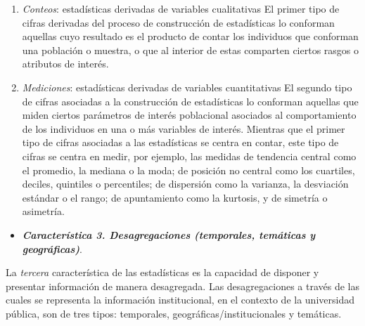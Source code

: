 \documentclass[
]{book}
\providecommand{\tightlist}{%
  \setlength{\itemsep}{0pt}\setlength{\parskip}{0pt}}
\begin{document}
\begin{enumerate}
\def\labelenumi{\arabic{enumi}.}
\item
  \emph{Conteos}: estadísticas derivadas de variables cualitativas
  El primer tipo de cifras derivadas del proceso de construcción de estadísticas lo conforman aquellas cuyo resultado es el producto de contar los individuos que conforman una población o muestra, o que al interior de estas comparten ciertos rasgos o atributos de interés.
\item
  \emph{Mediciones}: estadísticas derivadas de variables cuantitativas
  El segundo tipo de cifras asociadas a la construcción de estadísticas lo conforman aquellas que miden ciertos parámetros de interés poblacional asociados al comportamiento de los individuos en una o más variables de interés. Mientras que el primer tipo de cifras asociadas a las estadísticas se centra en contar, este tipo de cifras se centra en medir, por ejemplo, las medidas de tendencia central como el promedio, la mediana o la moda; de posición no central como los cuartiles, deciles, quintiles o percentiles; de dispersión como la varianza, la desviación estándar o el rango; de apuntamiento como la kurtosis, y de simetría o asimetría.
\end{enumerate}

\begin{itemize}
\tightlist
\item
  \textbf{\emph{Característica 3. Desagregaciones (temporales, temáticas y geográficas)}}.
\end{itemize}

La \emph{tercera} característica de las estadísticas es la capacidad de disponer y presentar información de manera desagregada. Las desagregaciones a través de las cuales se representa la información institucional, en el contexto de la universidad pública, son de tres tipos: temporales, geográficas/institucionales y temáticas.
\end{document}
